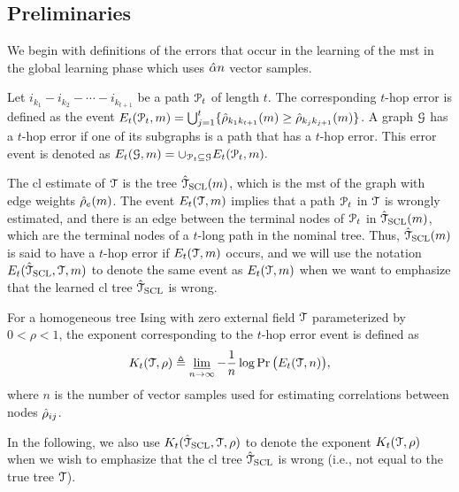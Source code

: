 \subsection{Preliminaries}\label{sec:pfpre}
We begin with definitions of the errors that occur in the learning of the \ac{mst} in the global learning phase which uses $\hat{\alpha} n$ vector samples.  
\begin{definition} \label{def:thop}
	Let $i_{k_{1}}-i_{k_{2}}-\cdots -i_{k_{t+1}}$ be a   path $\mathcal{P}_{t}$ of length $t$. The corresponding $t$-hop error is defined as the event $E_{t}(\mathcal{P}_{t},m)=\bigcup_{j=1}^{t}\{\hat{\rho}_{k_{1}k_{t+1}}(m)\geq \hat{\rho}_{k_{j}k_{j+1}}(m)\}$. A graph 
	$\mathcal{G}$ has a $t$-hop error if one of its subgraphs is a path that has a $t$-hop error. This error event   is denoted as $E_{t}(\mathcal{G},m)=\cup_{\mathcal{P}_{t} \subseteq \mathcal{G}}E_{t}(\mathcal{P}_{t},m).$
\end{definition}
\begin{remark}
	The \ac{cl} estimate of $\mathcal{T}$ is the tree $\hat{\mathcal{T}}_{{\rm SCL}}(m)$, which is the \ac{mst} of the graph with edge weights $\hat{\rho}_{e}(m)$. The event $E_{t}(\mathcal{T},m)$ implies that a path $\mathcal{P}_{t}$ in $\mathcal{T}$ is wrongly estimated, and 
	there is an edge between the terminal nodes of $\mathcal{P}_{t}$ in $\hat{\mathcal{T}}_{{\rm SCL}}(m)$, which are the terminal nodes of a $t$-long path in the nominal tree. Thus, $\hat{\mathcal{T}}_{{\rm SCL}}(m)$ is said to have a $t$-hop error if $E_{t}(\mathcal{T},m)$ occurs, and 
	we will use the notation $E_{t}(\hat{\mathcal{T}}_{{\rm SCL}},\mathcal{T},m)$ to denote the same event as $E_{t}(\mathcal{T},m)$ when we want to emphasize that the learned \ac{cl} tree $\hat{\mathcal{T}}_{{\rm SCL}}$ is wrong.
\end{remark}
\begin{definition}
For a homogeneous tree Ising with zero external field $\mathcal{T}$ parameterized by $0<\rho<1$, the exponent corresponding to the $t$-hop error event is defined as
\begin{align}\label{eq:thopee}
	K _{t}(\mathcal{T},\rho)\triangleq \varliminf_{n\rightarrow \infty}-\frac{1}{n}\log\Pr \big(E_{t}(\mathcal{T},n)\big),
\end{align}
where $n$ is the number of vector samples used for estimating correlations between nodes $\hat{\rho}_{ij}$.
\end{definition} 
In the following, we also use $K _{t}(\hat{\mathcal{T}}_{{\rm SCL}},\mathcal{T},\rho)$ to denote the exponent $K _{t}(\mathcal{T},\rho)$ when we wish to emphasize that the \ac{cl} tree $\hat{\mathcal{T}}_{{\rm SCL}}$ is wrong (i.e., not equal to the true tree $\mathcal{T}$). 
